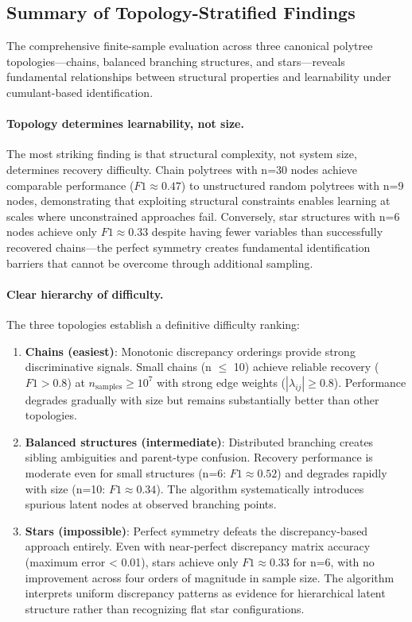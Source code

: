 \documentclass[11pt,a4paper]{article}
\numberwithin{equation}{section}
\begin{document}
\subsection{Summary of Topology-Stratified Findings}

The comprehensive finite-sample evaluation across three canonical polytree topologies—chains, balanced branching structures, and stars—reveals fundamental relationships between structural properties and learnability under cumulant-based identification.

\paragraph{Topology determines learnability, not size.} The most striking finding is that structural complexity, not system size, determines recovery difficulty. Chain polytrees with n=30 nodes achieve comparable performance ($F1 \approx 0.47$) to unstructured random polytrees with n=9 nodes, demonstrating that exploiting structural constraints enables learning at scales where unconstrained approaches fail. Conversely, star structures with n=6 nodes achieve only $F1 \approx 0.33$ despite having fewer variables than successfully recovered chains—the perfect symmetry creates fundamental identification barriers that cannot be overcome through additional sampling.

\paragraph{Clear hierarchy of difficulty.} The three topologies establish a definitive difficulty ranking:

\begin{enumerate}[label=(\arabic*)]
\item \textbf{Chains (easiest)}: Monotonic discrepancy orderings provide strong discriminative signals. Small chains (n $\leq$ 10) achieve reliable recovery ($F1 > 0.8$) at $n_{\text{samples}} \geq 10^7$ with strong edge weights ($|\lambda_{ij}| \geq 0.8$). Performance degrades gradually with size but remains substantially better than other topologies.

\item \textbf{Balanced structures (intermediate)}: Distributed branching creates sibling ambiguities and parent-type confusion. Recovery performance is moderate even for small structures (n=6: $F1 \approx 0.52$) and degrades rapidly with size (n=10: $F1 \approx 0.34$). The algorithm systematically introduces spurious latent nodes at observed branching points.

\item \textbf{Stars (impossible)}: Perfect symmetry defeats the discrepancy-based approach entirely. Even with near-perfect discrepancy matrix accuracy (maximum error < 0.01), stars achieve only $F1 \approx 0.33$ for n=6, with no improvement across four orders of magnitude in sample size. The algorithm interprets uniform discrepancy patterns as evidence for hierarchical latent structure rather than recognizing flat star configurations.
\end{enumerate}
\end{document}
